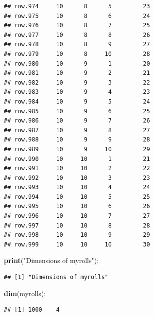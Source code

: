 \documentclass[
]{article}
\newenvironment{Shaded}{\begin{snugshade}}{\end{snugshade}}
\newcommand{\KeywordTok}[1]{\textcolor[rgb]{0.13,0.29,0.53}{\textbf{#1}}}
\newcommand{\NormalTok}[1]{#1}
\newcommand{\OperatorTok}[1]{\textcolor[rgb]{0.81,0.36,0.00}{\textbf{#1}}}
\newcommand{\StringTok}[1]{\textcolor[rgb]{0.31,0.60,0.02}{#1}}
\begin{document}
\begin{verbatim}
## row.974     10      8      5         23
## row.975     10      8      6         24
## row.976     10      8      7         25
## row.977     10      8      8         26
## row.978     10      8      9         27
## row.979     10      8     10         28
## row.980     10      9      1         20
## row.981     10      9      2         21
## row.982     10      9      3         22
## row.983     10      9      4         23
## row.984     10      9      5         24
## row.985     10      9      6         25
## row.986     10      9      7         26
## row.987     10      9      8         27
## row.988     10      9      9         28
## row.989     10      9     10         29
## row.990     10     10      1         21
## row.991     10     10      2         22
## row.992     10     10      3         23
## row.993     10     10      4         24
## row.994     10     10      5         25
## row.995     10     10      6         26
## row.996     10     10      7         27
## row.997     10     10      8         28
## row.998     10     10      9         29
## row.999     10     10     10         30
\end{verbatim}

\begin{Shaded}
\begin{Highlighting}[]
\KeywordTok{print}\NormalTok{(}\StringTok{"Dimensions of myrolls"}\NormalTok{);}
\end{Highlighting}
\end{Shaded}

\begin{verbatim}
## [1] "Dimensions of myrolls"
\end{verbatim}

\begin{Shaded}
\begin{Highlighting}[]
\KeywordTok{dim}\NormalTok{(myrolls);}
\end{Highlighting}
\end{Shaded}

\begin{verbatim}
## [1] 1000    4
\end{verbatim}

\begin{Shaded}
\end{Shaded}
\end{document}
